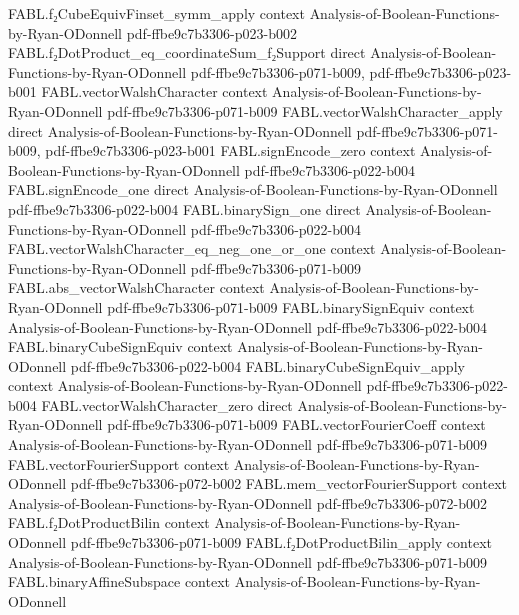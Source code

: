 \begin{theorem}
  {FABL.f₂CubeEquivFinset_symm_apply}
  {context}
  {Analysis-of-Boolean-Functions-by-Ryan-ODonnell}
  {pdf-ffbe9c7b3306-p023-b002}
\proofstep
  {FABL.f₂DotProduct_eq_coordinateSum_f₂Support}
  {direct}
  {Analysis-of-Boolean-Functions-by-Ryan-ODonnell}
  {pdf-ffbe9c7b3306-p071-b009,
    pdf-ffbe9c7b3306-p023-b001}
\proofstep
  {FABL.vectorWalshCharacter}
  {context}
  {Analysis-of-Boolean-Functions-by-Ryan-ODonnell}
  {pdf-ffbe9c7b3306-p071-b009}
\proofstep
  {FABL.vectorWalshCharacter_apply}
  {direct}
  {Analysis-of-Boolean-Functions-by-Ryan-ODonnell}
  {pdf-ffbe9c7b3306-p071-b009,
    pdf-ffbe9c7b3306-p023-b001}
\proofstep
  {FABL.signEncode_zero}
  {context}
  {Analysis-of-Boolean-Functions-by-Ryan-ODonnell}
  {pdf-ffbe9c7b3306-p022-b004}
\proofstep
  {FABL.signEncode_one}
  {direct}
  {Analysis-of-Boolean-Functions-by-Ryan-ODonnell}
  {pdf-ffbe9c7b3306-p022-b004}
\proofstep
  {FABL.binarySign_one}
  {direct}
  {Analysis-of-Boolean-Functions-by-Ryan-ODonnell}
  {pdf-ffbe9c7b3306-p022-b004}
\proofstep
  {FABL.vectorWalshCharacter_eq_neg_one_or_one}
  {context}
  {Analysis-of-Boolean-Functions-by-Ryan-ODonnell}
  {pdf-ffbe9c7b3306-p071-b009}
\proofstep
  {FABL.abs_vectorWalshCharacter}
  {context}
  {Analysis-of-Boolean-Functions-by-Ryan-ODonnell}
  {pdf-ffbe9c7b3306-p071-b009}
\proofstep
  {FABL.binarySignEquiv}
  {context}
  {Analysis-of-Boolean-Functions-by-Ryan-ODonnell}
  {pdf-ffbe9c7b3306-p022-b004}
\proofstep
  {FABL.binaryCubeSignEquiv}
  {context}
  {Analysis-of-Boolean-Functions-by-Ryan-ODonnell}
  {pdf-ffbe9c7b3306-p022-b004}
\proofstep
  {FABL.binaryCubeSignEquiv_apply}
  {context}
  {Analysis-of-Boolean-Functions-by-Ryan-ODonnell}
  {pdf-ffbe9c7b3306-p022-b004}
\proofstep
  {FABL.vectorWalshCharacter_zero}
  {direct}
  {Analysis-of-Boolean-Functions-by-Ryan-ODonnell}
  {pdf-ffbe9c7b3306-p071-b009}
\proofstep
  {FABL.vectorFourierCoeff}
  {context}
  {Analysis-of-Boolean-Functions-by-Ryan-ODonnell}
  {pdf-ffbe9c7b3306-p071-b009}
\proofstep
  {FABL.vectorFourierSupport}
  {context}
  {Analysis-of-Boolean-Functions-by-Ryan-ODonnell}
  {pdf-ffbe9c7b3306-p072-b002}
\proofstep
  {FABL.mem_vectorFourierSupport}
  {context}
  {Analysis-of-Boolean-Functions-by-Ryan-ODonnell}
  {pdf-ffbe9c7b3306-p072-b002}
\proofstep
  {FABL.f₂DotProductBilin}
  {context}
  {Analysis-of-Boolean-Functions-by-Ryan-ODonnell}
  {pdf-ffbe9c7b3306-p071-b009}
\proofstep
  {FABL.f₂DotProductBilin_apply}
  {context}
  {Analysis-of-Boolean-Functions-by-Ryan-ODonnell}
  {pdf-ffbe9c7b3306-p071-b009}
\proofstep
  {FABL.binaryAffineSubspace}
  {context}
  {Analysis-of-Boolean-Functions-by-Ryan-ODonnell}

\end{theorem}
